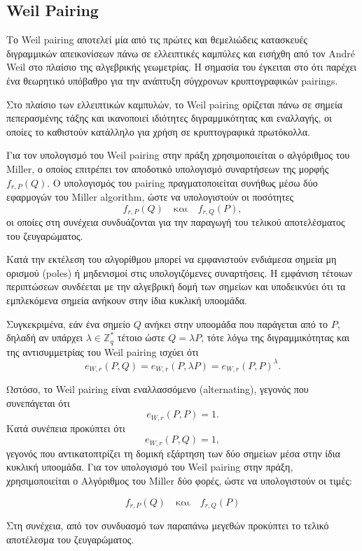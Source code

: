 \documentclass[12pt,a4paper]{report}
\begin{document}
\subsection{Weil Pairing}

Το Weil pairing αποτελεί μία από τις πρώτες και θεμελιώδεις κατασκευές διγραμμικών απεικονίσεων πάνω σε ελλειπτικές καμπύλες και εισήχθη από τον André Weil στο πλαίσιο της αλγεβρικής γεωμετρίας. Η σημασία του έγκειται στο ότι παρέχει ένα θεωρητικό υπόβαθρο για την ανάπτυξη σύγχρονων κρυπτογραφικών pairings.

Στο πλαίσιο των ελλειπτικών καμπυλών, το Weil pairing ορίζεται πάνω σε σημεία πεπερασμένης τάξης και ικανοποιεί ιδιότητες διγραμμικότητας και εναλλαγής, οι οποίες το καθιστούν κατάλληλο για χρήση σε κρυπτογραφικά πρωτόκολλα.

Για τον υπολογισμό του Weil pairing στην πράξη χρησιμοποιείται ο αλγόριθμος του Miller, ο οποίος επιτρέπει τον αποδοτικό υπολογισμό συναρτήσεων της μορφής $f_{r,P}(Q)$. Ο υπολογισμός του pairing πραγματοποιείται συνήθως μέσω δύο εφαρμογών του Miller algorithm, ώστε να υπολογιστούν οι ποσότητες
\[
f_{r,P}(Q) \quad \text{και} \quad f_{r,Q}(P),
\]
οι οποίες στη συνέχεια συνδυάζονται για την παραγωγή του τελικού αποτελέσματος του ζευγαρώματος.

Κατά την εκτέλεση του αλγορίθμου μπορεί να εμφανιστούν ενδιάμεσα σημεία μη ορισμού (poles) ή μηδενισμοί στις υπολογιζόμενες συναρτήσεις. Η εμφάνιση τέτοιων περιπτώσεων συνδέεται με την αλγεβρική δομή των σημείων και υποδεικνύει ότι τα εμπλεκόμενα σημεία ανήκουν στην ίδια κυκλική υποομάδα.

Συγκεκριμένα, εάν ένα σημείο $Q$ ανήκει στην υποομάδα που παράγεται από το $P$, δηλαδή αν υπάρχει $\lambda \in \mathbb{Z}_q^*$ τέτοιο ώστε $Q = \lambda P$, τότε λόγω της διγραμμικότητας και της αντισυμμετρίας του Weil pairing ισχύει ότι
\[
e_{W,r}(P,Q) = e_{W,r}(P, \lambda P) = e_{W,r}(P,P)^\lambda.
\]

Ωστόσο, το Weil pairing είναι εναλλασσόμενο (alternating), γεγονός που συνεπάγεται ότι
\[
e_{W,r}(P,P) = 1.
\]
Κατά συνέπεια προκύπτει ότι
\[
e_{W,r}(P,Q) = 1,
\]
γεγονός που αντικατοπτρίζει τη δομική εξάρτηση των δύο σημείων μέσα στην ίδια κυκλική υποομάδα.
Για τον υπολογισμό του Weil pairing στην πράξη, χρησιμοποιείται ο Αλγόριθμος του Miller δύο φορές, ώστε να υπολογιστούν οι τιμές:

\[
f_{r,P}(Q) \quad \text{και} \quad f_{r,Q}(P)
\]

Στη συνέχεια, από τον συνδυασμό των παραπάνω μεγεθών προκύπτει το τελικό αποτέλεσμα του ζευγαρώματος.
\end{document}
